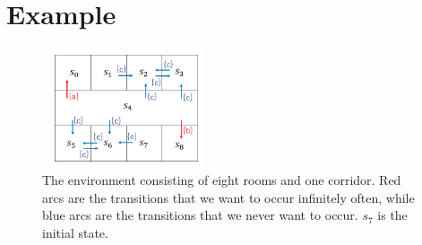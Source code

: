 \section{Example}

\begin{figure}[tbp]
    \centering
    \includegraphics[bb=0 0 377 290,height=3.5cm,width=5cm]{MDP_corridor.png}
    \caption{The environment consisting of eight rooms and one corridor. Red arcs are the transitions that we want to occur infinitely often, while blue arcs are the transitions that we never want to occur. $s_7$ is the initial state.}
    \label{Grid1}
\end{figure}

